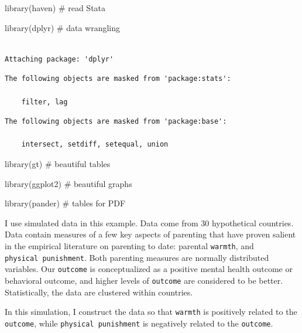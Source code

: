 \documentclass[
  letterpaper,
  DIV=11,
  numbers=noendperiod]{scrreprt}
\newenvironment{Shaded}{\begin{snugshade}}{\end{snugshade}}
\newcommand{\CommentTok}[1]{\textcolor[rgb]{0.37,0.37,0.37}{#1}}
\newcommand{\FunctionTok}[1]{\textcolor[rgb]{0.28,0.35,0.67}{#1}}
\newcommand{\NormalTok}[1]{\textcolor[rgb]{0.00,0.23,0.31}{#1}}
\begin{document}
\begin{Shaded}
\begin{Highlighting}[]
\FunctionTok{library}\NormalTok{(haven) }\CommentTok{\# read Stata}

\FunctionTok{library}\NormalTok{(dplyr) }\CommentTok{\# data wrangling}
\end{Highlighting}
\end{Shaded}

\begin{verbatim}

Attaching package: 'dplyr'
\end{verbatim}

\begin{verbatim}
The following objects are masked from 'package:stats':

    filter, lag
\end{verbatim}

\begin{verbatim}
The following objects are masked from 'package:base':

    intersect, setdiff, setequal, union
\end{verbatim}

\begin{Shaded}
\begin{Highlighting}[]
\FunctionTok{library}\NormalTok{(gt) }\CommentTok{\# beautiful tables}

\FunctionTok{library}\NormalTok{(ggplot2) }\CommentTok{\# beautiful graphs}

\FunctionTok{library}\NormalTok{(pander) }\CommentTok{\# tables for PDF}
\end{Highlighting}
\end{Shaded}

I use simulated data in this example. Data come from 30 hypothetical
countries. Data contain measures of a few key aspects of parenting that
have proven salient in the empirical literature on parenting to date:
parental \texttt{warmth}, and \texttt{physical\ punishment}. Both
parenting measures are normally distributed variables. Our
\texttt{outcome} is conceptualized as a positive mental health outcome
or behavioral outcome, and higher levels of \texttt{outcome} are
considered to be better. Statistically, the data are clustered within
countries.

In this simulation, I construct the data so that \texttt{warmth} is
positively related to the \texttt{outcome}, while
\texttt{physical\ punishment} is negatively related to the
\texttt{outcome}.
\end{document}
